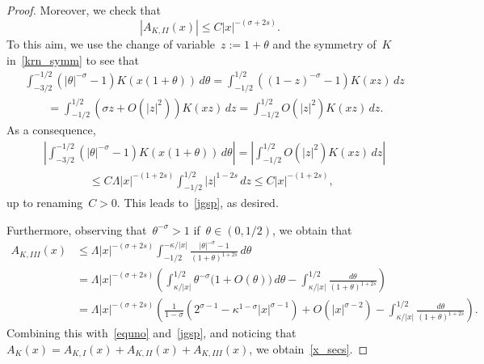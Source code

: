 \documentclass[10pt,a4paper]{amsart}
\numberwithin{equation}{section}
\begin{document}
\begin{proof}
Moreover, we check that
\begin{equation}\label{jgsp}
| A_{K,II}(x)| \leq C |x |^{-(\sigma+2s)}.
\end{equation}
To this aim, we use the change of variable~$z:= 1+\theta$ and
the symmetry of~$K$ in~\eqref{krn_symm}
to see that
\begin{equation*}
\begin{split}
&\int_{-{3}/{2}}^{-{1}/{2}} \left( |\theta|^{-\sigma}-1 \right) K \left( x(1+\theta)\right) \, d\theta 
= \int_{-{1}/{2}}^{{1}/{2}} \left( ( 1-z)^{-\sigma}-1\right) K(xz) \, dz \\
&\qquad=\int_{-{1}/{2}}^{{1}/{2}} \left( \sigma z +O(|z |^2) \right) K(xz) \, dz 
=\int_{-{1}/{2}}^{{1}/{2}} O(|z |^2) K(xz) \, dz.
\end{split}
\end{equation*}
As a consequence,
\begin{equation*}
\begin{split}
&\left| \int_{-{3}/{2}}^{-{1}/{2}} \left( |\theta|^{-\sigma}-1 \right) K \left( x(1+\theta)\right) \, d\theta \right|
= \left|\int_{-{1}/{2}}^{{1}/{2}} O(|z |^2)  K(xz) \, dz\right|\\
&\qquad\qquad\leq C\Lambda |x |^{-(1+2s)}  \int_{-{1}/{2}}^{{1}/{2}}| z|^{1-2s}\, dz \leq C |x |^{-(1+2s)} ,
\end{split}
\end{equation*} up to renaming~$C>0$.
This leads to~\eqref{jgsp}, as desired.

Furthermore, observing that~$\theta^{-\sigma}>1$ if~$\theta \in (0,1/2)$, we obtain that
\begin{equation*}
\begin{split}
A_{K,III}(x) & \leq \Lambda |x |^{-(\sigma+2s)} 
\int_{-{1}/{2}}^{-{\kappa}/{|x|}} \frac{ |\theta|^{-\sigma}-1}{ (1+\theta)^{1+2s}} \, d\theta\\
&= \Lambda |x |^{-(\sigma+2s)} 
\left(
\int_{{\kappa}/{| x |}}^{{1}/{2}} 
\theta^{-\sigma}\big(1+O(\theta)\big) \, d\theta -
\int_{{\kappa}/{|x |}}^{{1}/{2}} \frac{d\theta}{(1+\theta)^{1+2s}}\right)\\
&= \Lambda |x |^{-(\sigma+2s)} 
\left( \frac{1}{1-\sigma}\left(2^{\sigma-1} -\kappa^{1-\sigma}|x|^{\sigma-1} \right) +O(|x|^{\sigma-2})
-\int_{{\kappa}/{|x |}}^{{1}/{2}} \frac{d\theta}{(1+\theta)^{1+2s}}\right).
\end{split}
\end{equation*}
Combining this with~\eqref{equno} and~\eqref{jgsp},
and noticing that~$A_K(x) = A_{K,I}(x)+ A_{K,II}(x)+ A_{K,III}(x)$,
we obtain~\eqref{x_secs}. 


\end{proof}
\end{document}
